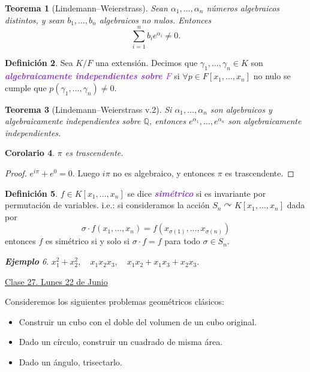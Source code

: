 \documentclass{article}
\newtheorem{theorem}{Teorema}[subsection]
\newtheorem{corollary}[theorem]{Corolario}
\theoremstyle{definition}
\newtheorem{definition}[theorem]{Definición}
\theoremstyle{remark}
\newtheorem{example}[theorem]{\textbf{Ejemplo}}
\numberwithin{equation}{section}
\newcommand{\Q}{\mathbb{Q}}
\renewcommand{\a}{\alpha}
\newcommand{\acts}{\curvearrowright}
\newcommand{\wea}[1]{\textcolor{BlueViolet}{\textbf{\emph{#1}}}}
\newcommand{\fecha}[1]{\begin{flushright} \underline{#1} \end{flushright}}
\begin{document}
\begin{theorem}
  [Lindemann--Weierstrass]
  Sean $\a_1, \dots, \a_n$ números algebraicos distintos, y sean $b_1, \dots, b_n$ algebraicos no nulos. Entonces
  \[ \sum_{i=1}^n b_i e^{\a_i} \neq 0. \]
\end{theorem}

\begin{definition}
  Sea $K/F$ una extensión. Decimos que $\gamma_1, \dots, \gamma_n \in K$ son \wea{algebraicamente independientes sobre $F$} si $\forall p \in F[x_1,\dots,x_n]$ no nulo se cumple que $p(\gamma_1,\dots,\gamma_n) \neq 0$.
\end{definition}

\begin{theorem}
  [Lindemann--Weierstrass v.2]
  Si $\a_1,\dots,\a_n$ son algebraicos y algebraicamente independientes sobre $\Q$, entonces $e^{\a_1}, \dots, e^{\a_n}$ son algebraicamente independientes.
\end{theorem}

\begin{corollary}
  $\pi$ es trascendente.
\end{corollary}
\begin{proof}
  $e^{i\pi} + e^0 = 0$. Luego $i\pi$ no es algebraico, y entonces $\pi$ es trascendente.
\end{proof}

\begin{definition}
  $f \in K[x_1,\dots,x_n]$ se dice \wea{simétrico} si es invariante por permutación de variables. i.e.: si consideramos la acción $S_n \acts K[x_1,\dots,x_n]$ dada por
  \[ \sigma \cdot f(x_1,\dots,x_n) = f(x_{\sigma(1)},\dots, x_{\sigma(n)}) \]
  entonces $f$ es simétrico si y solo si $\sigma \cdot f = f$ para todo $\sigma \in S_n$.
\end{definition}

\begin{example}
  $x_1^2 + x_2^2, \quad x_1x_2x_3,\quad x_1x_2 + x_1 x_3 + x_2 x_3$.
\end{example}

\fecha{Clase 27. Lunes 22 de Junio}

Consideremos los siguientes problemas geométricos clásicos:
\begin{itemize}
  \item Construir un cubo con el doble del volumen de un cubo original.
  \item Dado un círculo, construir un cuadrado de misma área.
  \item Dado un ángulo, trisectarlo.
\end{itemize}
\end{document}

